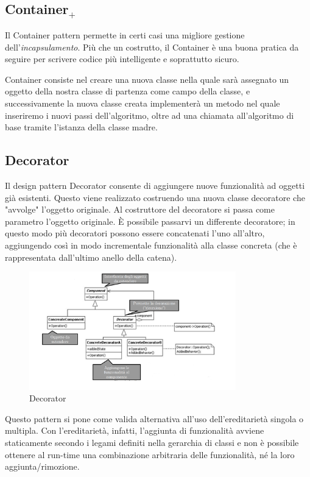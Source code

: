 \subsection{Container$_+$}
Il Container pattern permette in certi casi una migliore gestione dell'\textit{incapsulamento}. 
Più che un costrutto, il Container è una buona pratica da seguire per scrivere codice più intelligente e soprattutto sicuro. 

Container consiste nel creare una nuova classe nella quale sarà assegnato un oggetto della nostra classe di partenza come campo della classe, e successivamente la nuova classe creata implementerà un metodo nel quale inseriremo i nuovi passi dell'algoritmo, oltre ad una chiamata all'algoritmo di base tramite l'istanza della classe madre.

\subsection{Decorator}
Il design pattern Decorator consente di aggiungere nuove funzionalità ad oggetti già esistenti. 
Questo viene realizzato costruendo una nuova classe decoratore che "avvolge" l'oggetto originale. 
Al costruttore del decoratore si passa come parametro l'oggetto originale. 
È possibile passarvi un differente decoratore; in questo modo più decoratori possono essere concatenati l'uno all'altro, aggiungendo così in modo incrementale funzionalità alla classe concreta (che è rappresentata dall'ultimo anello della catena).

\begin{figure}[H]
\includegraphics[width=0.8\textwidth]{res/img/DP/decorator}
\caption{Decorator}
\end{figure}

Questo pattern si pone come valida alternativa all'uso dell'ereditarietà singola o multipla. 
Con l'ereditarietà, infatti, l'aggiunta di funzionalità avviene staticamente secondo i legami definiti nella gerarchia di classi e non è possibile ottenere al run-time una combinazione arbitraria delle funzionalità, né la loro aggiunta/rimozione.

